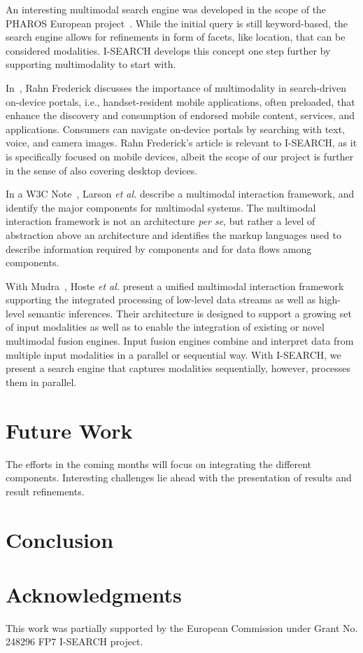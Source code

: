 \documentclass{acm_proc_article-sp}
\newcommand{\inlinelistingsize}{\fontsize{8pt}{11pt}}
\let\oldttdefault\ttdefault
\renewcommand{\ttdefault}{pcr}
\let\oldurl\url
\renewcommand{\url}[1]{\inlinelistingsize\oldurl{#1}}
\begin{document}
An interesting multimodal search engine was developed in the scope of the PHAROS European project~\cite{pharos2008}. While the initial query is still keyword-based, the search engine allows for refinements in form of facets, like location, that can be considered modalities.
\mbox{I-SEARCH} develops this concept one step further by supporting multimodality to start with.

In~\cite{multimodalitysun}, Rahn Frederick discusses the importance of multimodality in search-driven on-device portals, i.e., handset-resident mobile applications, often preloaded, that enhance the discovery and consumption of endorsed mobile content, services, and applications.
Consumers can navigate on-device portals by searching with text, voice, and camera images.
Rahn Frederick's article is relevant to \mbox{I-SEARCH}, as it is specifically focused on mobile devices, albeit the scope of our project is further in the sense of also covering desktop devices. 

In a W3C Note~\cite{w3cmultimodal2003}, Larson \textit{et al.} describe a multimodal interaction framework, and identify the major components for multimodal systems.
The multimodal interaction framework is not an architecture \textit{per se}, but rather a level of abstraction above an architecture and identifies the markup languages used to describe information required by components and for data flows among components.

With Mudra~\cite{mudra2011}, Hoste \textit{et al.} present a unified multimodal interaction framework supporting the integrated processing of low-level data streams as well as high-level semantic inferences.
Their architecture is designed to support a growing set of input modalities as well as to enable the integration of existing or novel multimodal fusion engines.
Input fusion engines combine and interpret data from multiple input modalities in a parallel or sequential way.
With \mbox{I-SEARCH}, we present a search engine that captures modalities sequentially, however, processes them in parallel.

\section{Future Work} \label{sec:futurework}
The efforts in the coming months will focus on integrating the different components.
Interesting challenges lie ahead with the presentation of results and result refinements.

\section{Conclusion} \label{sec:conclusion}


\section{Acknowledgments}
This work was partially supported by the European Commission under Grant No. 248296 FP7 \mbox{I-SEARCH} project.

\let\ttdefault\oldttdefault
\let\url\oldurl




\balancecolumns
\end{document}

